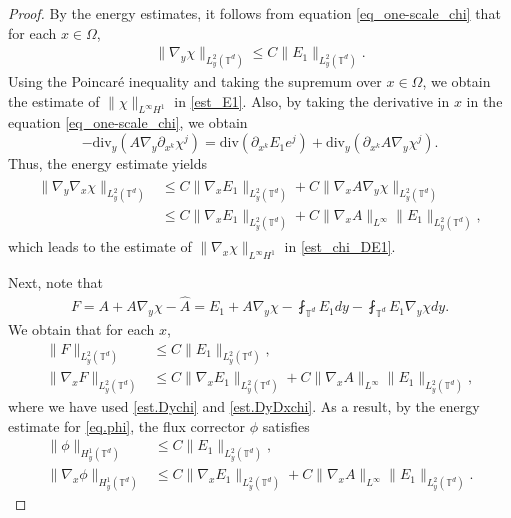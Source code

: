 \documentclass[reqno,12pt]{amsart} %
\theoremstyle{definition}
\theoremstyle{remark}
\numberwithin{equation}{section}
\begin{document}
\begin{proof}
By the energy estimates, it follows from equation \eqref{eq_one-scale_chi} that for each $x\in\Omega$,
\begin{align}\label{est.Dychi}
  \|\nabla_{y}\chi\|_{L_{y}^2(\mathbb{T}^d)}\leq C\|E_1\|_{L_{y}^2(\mathbb{T}^d)}.
\end{align}
Using the Poincar\'{e} inequality and taking the supremum over $x\in \Omega$, we obtain the estimate of $\|\chi\|_{L^\infty H^1}$ in \eqref{est_E1}. Also, 
by taking the derivative in $x$ in  the equation \eqref{eq_one-scale_chi}, we obtain 
\begin{equation*}
    -\mathrm{div}_y(A\nabla_y \partial_{x^k}\chi^j)= \mathrm{div}(\partial_{x^k} E_1 e^j) + \mathrm{div}_y(\partial_{x^k} A\nabla_y \chi^j).
\end{equation*}
Thus, the energy estimate yields
\begin{align}\label{est.DyDxchi}
  \begin{split}
  \|\nabla_y\nabla_x\chi\|_{L_{y}^2(\mathbb{T}^d)}&\leq C\|\nabla_xE_1\|_{L_y^2(\mathbb{T}^d)}+C\|\nabla_xA\nabla_y\chi\|_{L_y^2(\mathbb{T}^d)}\\&\leq C\|\nabla_x E_1\|_{L_y^2(\mathbb{T}^d)}+C\|\nabla_x A\|_{L^\infty}\|E_1\|_{L_y^2(\mathbb{T}^d)},
  \end{split}
\end{align}
which leads to  the estimate of $\| \nabla_x \chi \|_{L^\infty H^1}$ in \eqref{est_chi_DE1}. 

Next, note that
\begin{align*}
  F = A+A\nabla_{y}\chi-\widehat{A}=E_1+A\nabla_{y}\chi-\fint_{\mathbb{T}^d}E_1 dy-\fint_{\mathbb{T}^d}E_1\nabla_{y} \chi dy.
\end{align*}
We obtain that  for each $x$,
\begin{align*}%
    \|F\|_{L^2_{y}(\mathbb{T}^d)}&\leq C\|E_1\|_{L^2_{y}(\mathbb{T}^d)},\\
    \|\nabla_x F\|_{L^2_{y}(\mathbb{T}^d)}&\leq C\|\nabla_xE_1\|_{L^2_{y}(\mathbb{T}^d)}+C\|\nabla_xA\|_{L^\infty}\|E_1\|_{L_y^2(\mathbb{T}^d)},
\end{align*}
where we have used  \eqref{est.Dychi} and \eqref{est.DyDxchi}.
As a result, by the energy estimate for \eqref{eq.phi}, the flux corrector $\phi$ satisfies
\begin{align*}
  \|\phi\|_{H^1_{y}(\mathbb{T}^d)}&\leq C\|E_1\|_{L^2_{y}(\mathbb{T}^d)},\\
  \|\nabla_x\phi\|_{H^1_{y}(\mathbb{T}^d)}&\leq C\|\nabla_xE_1\|_{L^2_{y}(\mathbb{T}^d)}+C\|\nabla_xA\|_{L^\infty}\|E_1\|_{L_y^2(\mathbb{T}^d)}.
\end{align*}


\end{proof}
\end{document}
